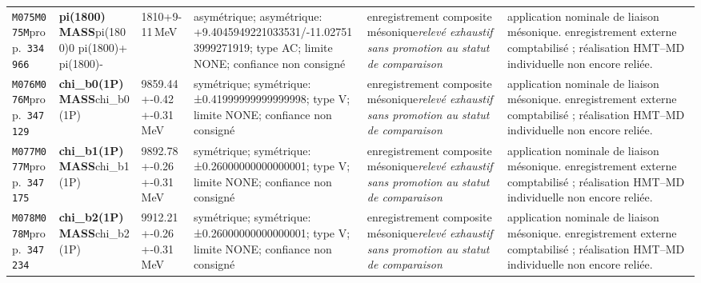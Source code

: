 \begin{landscape}
\begin{longtable}{L{1.85cm}L{4.45cm}L{2.35cm}L{4.05cm}L{3.35cm}L{7.15cm}}
\texttt{M075}\newline \texttt{M075M}\newline prop.\ \texttt{334966} & \textbf{pi(1800) MASS}\newline pi(1800)0 \textbar{}\allowbreak{} pi(1800)+ \textbar{}\allowbreak{} pi(1800)- & 1810+9-11\,MeV & asymétrique; asymétrique: +9.4045949221033531/-11.027513999271919; type AC; limite NONE; confiance non consigné & enregistrement composite mésonique\newline \emph{relevé exhaustif sans promotion au statut de comparaison} & application nominale de liaison mésonique. enregistrement externe comptabilisé ; réalisation HMT--MD individuelle non encore reliée. \\
\texttt{M076}\newline \texttt{M076M}\newline prop.\ \texttt{347129} & \textbf{chi\_\allowbreak{}b0(1P) MASS}\newline chi\_\allowbreak{}b0(1P) & 9859.44+-0.42+-0.31\,MeV & symétrique; symétrique: ±0.41999999999999998; type V; limite NONE; confiance non consigné & enregistrement composite mésonique\newline \emph{relevé exhaustif sans promotion au statut de comparaison} & application nominale de liaison mésonique. enregistrement externe comptabilisé ; réalisation HMT--MD individuelle non encore reliée. \\
\texttt{M077}\newline \texttt{M077M}\newline prop.\ \texttt{347175} & \textbf{chi\_\allowbreak{}b1(1P) MASS}\newline chi\_\allowbreak{}b1(1P) & 9892.78+-0.26+-0.31\,MeV & symétrique; symétrique: ±0.26000000000000001; type V; limite NONE; confiance non consigné & enregistrement composite mésonique\newline \emph{relevé exhaustif sans promotion au statut de comparaison} & application nominale de liaison mésonique. enregistrement externe comptabilisé ; réalisation HMT--MD individuelle non encore reliée. \\
\texttt{M078}\newline \texttt{M078M}\newline prop.\ \texttt{347234} & \textbf{chi\_\allowbreak{}b2(1P) MASS}\newline chi\_\allowbreak{}b2(1P) & 9912.21+-0.26+-0.31\,MeV & symétrique; symétrique: ±0.26000000000000001; type V; limite NONE; confiance non consigné & enregistrement composite mésonique\newline \emph{relevé exhaustif sans promotion au statut de comparaison} & application nominale de liaison mésonique. enregistrement externe comptabilisé ; réalisation HMT--MD individuelle non encore reliée. \\

\end{longtable}
\end{landscape}
